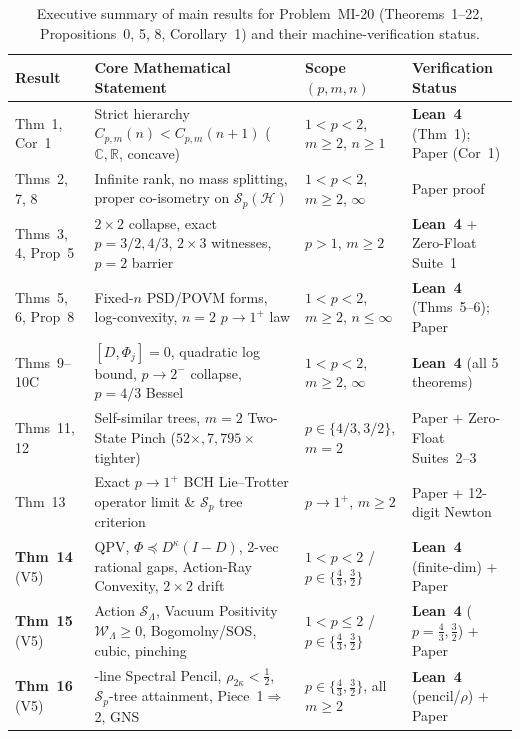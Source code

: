 \documentclass[10pt,letterpaper]{article}
\newcommand{\C}{\mathbb{C}}
\newcommand{\R}{\mathbb{R}}
\newcommand{\Hilb}{\mathcal{H}}
\newcommand{\Sp}{\mathcal{S}_p}
\begin{document}
\begin{table}[htbp]
\centering
\caption{\small Executive summary of main results for Problem~MI-20 (Theorems~1--22, Propositions~0, 5, 8, Corollary~1) and their machine-verification status.}
\vspace{3pt}
\footnotesize
\setlength{\tabcolsep}{4pt}
\begin{tabular}{@{}l >{\raggedright\arraybackslash}p{7.1cm} l >{\raggedright\arraybackslash}p{3.4cm}@{}}
\toprule
\textbf{Result} & \textbf{Core Mathematical Statement} & \textbf{Scope $(p, m, n)$} & \textbf{Verification Status} \\
\midrule
Thm~1, Cor~1 & Strict hierarchy $C_{p,m}(n) < C_{p,m}(n+1)$ ($\C,\R$, concave) & $1<p<2$, $m\ge 2$, $n\ge 1$ & \textbf{Lean~4} (Thm~1); Paper (Cor~1) \\
Thms~2, 7, 8 & Infinite rank, no mass splitting, proper co-isometry on $\Sp(\Hilb)$ & $1<p<2$, $m\ge 2$, $\infty$ & Paper proof \\
Thms~3, 4, Prop~5 & $2\times 2$ collapse, exact $p=3/2, 4/3$, $2\times 3$ witnesses, $p=2$ barrier & $p>1$, $m\ge 2$ & \textbf{Lean~4} + Zero-Float Suite~1 \\
Thms~5, 6, Prop~8 & Fixed-$n$ PSD/POVM forms, log-convexity, $n=2$ $p\to 1^+$ law & $1<p<2$, $m\ge 2$, $n\le\infty$ & \textbf{Lean~4} (Thms~5--6); Paper \\
Thms~9--10C & $[D,\Phi_j]=0$, quadratic log bound, $p\to 2^-$ collapse, $p=4/3$ Bessel & $1<p<2$, $m\ge 2$, $\infty$ & \textbf{Lean~4} (all 5 theorems) \\
Thms~11, 12 & Self-similar trees, $m=2$ Two-State Pinch ($52\times, 7{,}795\times$ tighter) & $p\in\{4/3, 3/2\}$, $m=2$ & Paper + Zero-Float Suites~2--3 \\
Thm~13 & Exact $p\to 1^+$ BCH Lie--Trotter operator limit \& $\Sp$ tree criterion & $p\to 1^+$, $m\ge 2$ & Paper + 12-digit Newton \\
\midrule
\textbf{Thm~14} (V5) & QPV, $\Phi \preceq D^\kappa(I-D)$, 2-vec rational gaps, Action-Ray Convexity, $2\times 2$ drift & $1<p<2$ / $p\in\{\tfrac{4}{3},\tfrac{3}{2}\}$ & \textbf{Lean~4} (finite-dim) + Paper \\
\textbf{Thm~15} (V5) & Action $\mathcal{S}_\Lambda$, Vacuum Positivity $\mathcal{W}_\Lambda \ge 0$, Bogomolny/SOS, cubic, pinching & $1<p\le 2$ / $p\in\{\tfrac{4}{3},\tfrac{3}{2}\}$ & \textbf{Lean~4} ($p=\tfrac{4}{3},\tfrac{3}{2}$) + Paper \\
\textbf{Thm~16} (V5) & 12-line Spectral Pencil, $\rho_{2\kappa} < \tfrac{1}{2}$, $\Sp$-tree attainment, Piece~1$\Rightarrow$2, GNS & $p\in\{\tfrac{4}{3},\tfrac{3}{2}\}$, all $m\ge 2$ & \textbf{Lean~4} (pencil/$\rho$) + Paper \\

\end{tabular}
\end{table}
\end{document}
